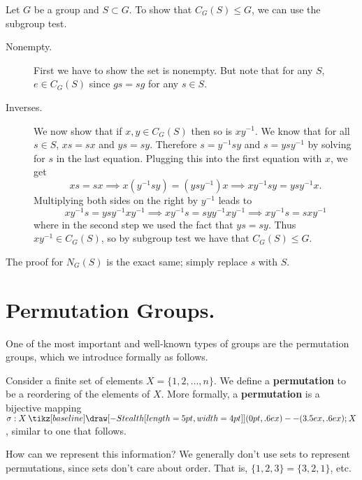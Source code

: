 \documentclass[12pt,letterpaper]{algebra_book}
\renewcommand{\to}{\mathbin{\tikz[baseline] \draw[-{Stealth[length=5pt,width=4pt]}] (0pt,.6ex) -- (3.5ex,.6ex);}}
\theoremstyle{definition}
\begin{document}
    \begin{prf}
        Let $G$ be a group and $S \subset G$. To show that $C_G(S) \le
        G$, we can use the subgroup test. 
        \begin{description}
            \item[Nonempty.] First we have to show the set is
            nonempty. But note that for any $S$, $e \in C_G(S)$ 
            since $gs = sg$ for any $s \in S$.

            \item[Inverses.] We now show that if $x, y \in C_G(S)$
            then so is $xy^{-1}$. We know that for all $s \in S$, $xs
            = sx$ and $ys = sy$. Therefore $s = y^{-1}sy$ and $s =
            ysy^{-1}$ by solving for $s$ in the last equation.
            Plugging this into the first equation with $x$, we get 
            \[
                xs = sx \implies x(y^{-1}sy) = (ysy^{-1})x 
                \implies xy^{-1}sy = ysy^{-1}x.
            \]
            Multiplying both sides on the right by $y^{-1}$ leads to 
            \[
                xy^{-1}s = ysy^{-1}xy^{-1} 
                \implies xy^{-1}s = syy^{-1}xy^{-1}
                \implies xy^{-1}s = sxy^{-1}
            \]
            where in the second step we used the fact that $ys = sy$.
            Thus $xy^{-1} \in C_G(S)$, so by subgroup test we have
            that $C_G(S) \le G$. 
        \end{description}

        The proof for $N_G(S)$ is the exact same; simply replace $s$
        with $S$.
    \end{prf}

    \newpage
    \section{Permutation Groups.}
    One of the most important and well-known types of groups are the
    permutation groups, which we introduce formally as follows. 

    Consider a finite set of elements $X = \{1, 2, \dots, n\}$. We
    define a 
    \textbf{permutation} to be a reordering of the elements of $X$.
    More formally, a \textbf{permutation} is a bijective mapping
    $\sigma: X \to X$, similar to one that follows. 

    How can we represent this information? We generally don't use sets
    to represent permutations, since sets 
    don't care about order. That is, $\{1, 2, 3\} = \{3,2,1\}$, etc.  
\end{document}
